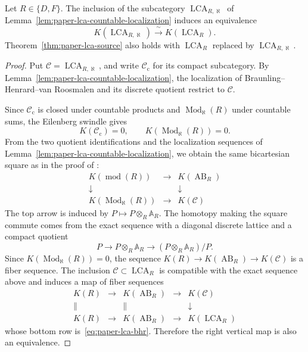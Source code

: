 \begin{lemma}\label{lem:paper-lca-countability}
Let $R\in\{D,F\}$.
The inclusion of the subcategory $\operatorname{LCA}_{R,\aleph}$ of Lemma~\ref{lem:paper-lca-countable-localization} induces an equivalence
\[
 K(\operatorname{LCA}_{R,\aleph})\xrightarrow{\ \sim\ }
 K(\operatorname{LCA}_R).
\]
Theorem~\ref{thm:paper-lca-source} also holds with $\operatorname{LCA}_R$ replaced by $\operatorname{LCA}_{R,\aleph}$.
\end{lemma}
\begin{proof}
Put $\mathcal C=\operatorname{LCA}_{R,\aleph}$, and write $\mathcal C_{\mathrm c}$ for its compact subcategory.
By Lemma~\ref{lem:paper-lca-countable-localization}, the localization of Braunling--Henrard--van Roosmalen and its discrete quotient restrict to $\mathcal C$.

Since $\mathcal C_{\mathrm c}$ is closed under countable products and $\operatorname{Mod}_\aleph(R)$ under countable sums, the Eilenberg swindle gives
\[
 K(\mathcal C_{\mathrm c})=0,
 \qquad K(\operatorname{Mod}_\aleph(R))=0.
\]
From the two quotient identifications and the localization sequences of Lemma~\ref{lem:paper-lca-countable-localization}, we obtain the same bicartesian square as in the proof of \cite[Theorem 6.2]{BHRAdeles}:
\[
\begin{array}{ccc}
 K(\operatorname{mod}(R))&\longrightarrow&K(\operatorname{AB}_R)\\
 \downarrow&&\downarrow\\
 K(\operatorname{Mod}_\aleph(R))&\longrightarrow&K(\mathcal C)
\end{array}
\]
The top arrow is induced by $P\mapsto P\otimes_R\mathbb A_R$.
The homotopy making the square commute comes from the exact sequence with a diagonal discrete lattice and a compact quotient
\[
 P\longrightarrow P\otimes_R\mathbb A_R
 \longrightarrow (P\otimes_R\mathbb A_R)/P.
\]
Since $K(\operatorname{Mod}_\aleph(R))=0$, the sequence $K(R)\to K(\operatorname{AB}_R)\to K(\mathcal C)$ is a fiber sequence.
The inclusion $\mathcal C\subset\operatorname{LCA}_R$ is compatible with the exact sequence above and induces a map of fiber sequences
\[
\begin{array}{ccccc}
 K(R)&\longrightarrow&K(\operatorname{AB}_R)&\longrightarrow&K(\mathcal C)\\
 \|&&\|&&\downarrow\\
 K(R)&\longrightarrow&K(\operatorname{AB}_R)&\longrightarrow&K(\operatorname{LCA}_R)
\end{array}
\]
whose bottom row is~\eqref{eq:paper-lca-bhr}.
Therefore the right vertical map is also an equivalence.
\end{proof}


